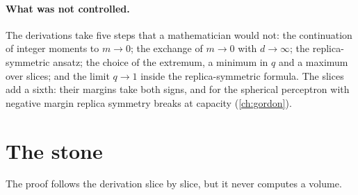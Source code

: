 \begin{refsection}
\paragraph{What was not controlled.} The derivations take five steps that a mathematician would not: the continuation of integer moments to $m\to0$; the exchange of $m\to0$ with $d\to\infty$; the replica-symmetric ansatz; the choice of the extremum, a minimum in $q$ and a maximum over slices; and the limit $q\to1$ inside the replica-symmetric formula. The slices add a sixth: their margins take both signs, and for the spherical perceptron with negative margin replica symmetry breaks at capacity (\cref{ch:gordon}).

\section{The stone}\label{sec:classification:stone}

The proof follows the derivation slice by slice, but it never computes a volume.


\end{refsection}

